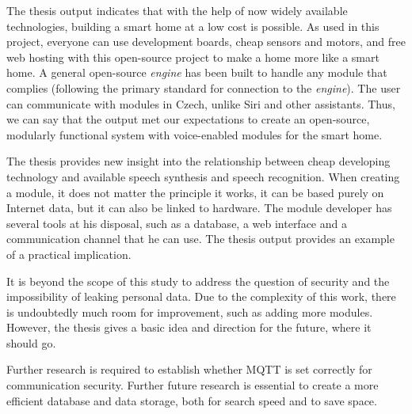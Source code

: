 The thesis output indicates that with the help of now widely available technologies, building a smart home at a low cost is possible. As used in this project, everyone can use development boards, cheap sensors and motors, and free web hosting with this open-source project to make a home more like a smart home. A general open-source \textit{engine} has been built to handle any module that complies (following the primary standard for connection to the \textit{engine}). The user can communicate with modules in Czech, unlike Siri and other assistants. Thus, we can say that the output met our expectations to create an open-source, modularly functional system with voice-enabled modules for the smart home.

The thesis provides new insight into the relationship between cheap developing technology and available speech synthesis and speech recognition. When creating a module, it does not matter the principle it works, it can be based purely on Internet data, but it can also be linked to hardware. The module developer has several tools at his disposal, such as a database, a web interface and a communication channel that he can use. The thesis output provides an example of a practical implication. 

It is beyond the scope of this study to address the question of security and the impossibility of leaking personal data. Due to the complexity of this work, there is undoubtedly much room for improvement, such as adding more modules. However, the thesis gives a basic idea and direction for the future, where it should go. 

Further research is required to establish whether MQTT is set correctly for communication security. Further future research is essential to create a more efficient database and data storage, both for search speed and to save space.